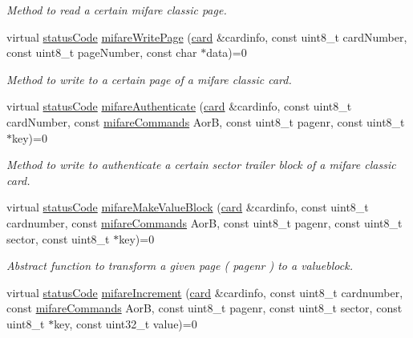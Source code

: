 \begin{DoxyCompactItemize}
\begin{DoxyCompactList}\small\item\em Method to read a certain mifare classic page. \end{DoxyCompactList}\item 
virtual \hyperlink{declarations_8h_ae1d20c5a38cae82ccaa6a77be3fd264b}{status\+Code} \hyperlink{classnfc_1_1NFC_a5b2d7d0316f500f2bc69203eee7aa655}{mifare\+Write\+Page} (\hyperlink{classcard}{card} \&cardinfo, const uint8\+\_\+t card\+Number, const uint8\+\_\+t page\+Number, const char $\ast$data)=0
\begin{DoxyCompactList}\small\item\em Method to write to a certain page of a mifare classic card. \end{DoxyCompactList}\item 
virtual \hyperlink{declarations_8h_ae1d20c5a38cae82ccaa6a77be3fd264b}{status\+Code} \hyperlink{classnfc_1_1NFC_a1a6dc3144b89ea1df4ac47b1d2e476d2}{mifare\+Authenticate} (\hyperlink{classcard}{card} \&cardinfo, const uint8\+\_\+t card\+Number, const \hyperlink{declarations_8h_a305b1a3bcfca65e2a82f0f9d24676835}{mifare\+Commands} AorB, const uint8\+\_\+t pagenr, const uint8\+\_\+t $\ast$key)=0
\begin{DoxyCompactList}\small\item\em Method to write to authenticate a certain sector trailer block of a mifare classic card. \end{DoxyCompactList}\item 
virtual \hyperlink{declarations_8h_ae1d20c5a38cae82ccaa6a77be3fd264b}{status\+Code} \hyperlink{classnfc_1_1NFC_a4904606f6d5d94c5c1fde57310af5691}{mifare\+Make\+Value\+Block} (\hyperlink{classcard}{card} \&cardinfo, const uint8\+\_\+t cardnumber, const \hyperlink{declarations_8h_a305b1a3bcfca65e2a82f0f9d24676835}{mifare\+Commands} AorB, const uint8\+\_\+t pagenr, const uint8\+\_\+t sector, const uint8\+\_\+t $\ast$key)=0
\begin{DoxyCompactList}\small\item\em Abstract function to transform a given page ( pagenr ) to a valueblock. \end{DoxyCompactList}\item 
virtual \hyperlink{declarations_8h_ae1d20c5a38cae82ccaa6a77be3fd264b}{status\+Code} \hyperlink{classnfc_1_1NFC_a2c14cb2a6f71cffcc949c084a0cefd2b}{mifare\+Increment} (\hyperlink{classcard}{card} \&cardinfo, const uint8\+\_\+t cardnumber, const \hyperlink{declarations_8h_a305b1a3bcfca65e2a82f0f9d24676835}{mifare\+Commands} AorB, const uint8\+\_\+t pagenr, const uint8\+\_\+t sector, const uint8\+\_\+t $\ast$key, const uint32\+\_\+t value)=0

\end{DoxyCompactItemize}
